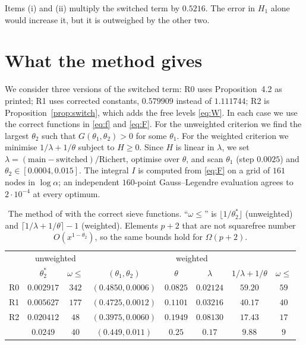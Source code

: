 \documentclass[11pt,a4paper]{amsart}
\theoremstyle{remark}
\numberwithin{equation}{section}
\begin{document}
Items (i) and (ii) multiply the switched term by $0.5216$. The error in $H_1$ alone would increase it, but it is
outweighed by the other two.

\section{What the method gives}\label{sec:restore}

We consider three versions of the switched term: R0 uses Proposition~4.2 as printed; R1 uses corrected constants,
$0.579909$ instead of $1.111744$; R2 is Proposition~\ref{prop:switch}, which adds the free levels \eqref{eq:W}. In
each case we use the correct functions in \eqref{eq:f} and \eqref{eq:F}. For the unweighted criterion we find the
largest $\theta_2$ such that $G(\theta_1,\theta_2)>0$ for some $\theta_1$. For the weighted criterion we minimise
$1/\lambda+1/\theta$ subject to $H\ge0$. Since $H$ is linear in $\lambda$, we set
$\lambda=(\text{main}-\text{switched})/\text{Richert}$, optimise over $\theta$, and scan $\theta_1$ (step $0.0025$)
and $\theta_2\in[0.0004,0.015]$. The integral $I$ is computed from \eqref{eq:F} on a grid of $161$ nodes in
$\log\alpha$; an independent $160$-point Gauss--Legendre evaluation agrees to $2\cdot10^{-4}$ at every optimum.

\begin{table}[htbp]
\centering\small
\begin{tabular}{lccccccc}
\toprule
& \multicolumn{2}{c}{unweighted} & \multicolumn{5}{c}{weighted}\\
\cmidrule(lr){2-3}\cmidrule(lr){4-8}
& $\theta_2^*$ & $\omega\le$ & $(\theta_1,\theta_2)$ & $\theta$ & $\lambda$ & $1/\lambda+1/\theta$ & $\omega\le$\\
\midrule
R0 & $0.002917$ & $342$ & $(0.4850,0.0006)$ & $0.0825$ & $0.02124$ & $59.20$ & $59$\\
R1 & $0.005627$ & $177$ & $(0.4725,0.0012)$ & $0.1101$ & $0.03216$ & $40.17$ & $40$\\
R2 & $0.020412$ & $48$ & $(0.3975,0.0060)$ & $0.1949$ & $0.08130$ & $17.43$ & $17$\\
\midrule
\cite{NX} & $0.0249$ & $40$ & $(0.449,0.011)$ & $0.25$ & $0.17$ & $9.88$ & $9$\\
\bottomrule
\end{tabular}
\caption{The method of \cite{NX} with the correct sieve functions. ``$\omega\le$'' is
$\lfloor1/\theta_2^*\rfloor$ (unweighted) and $\lceil1/\lambda+1/\theta\rceil-1$ (weighted). Elements $p+2$ that
are not squarefree number $O(x^{1-\theta_2})$, so the same bounds hold for $\Omega(p+2)$.}
\label{tab:restore}
\end{table}
\end{document}
